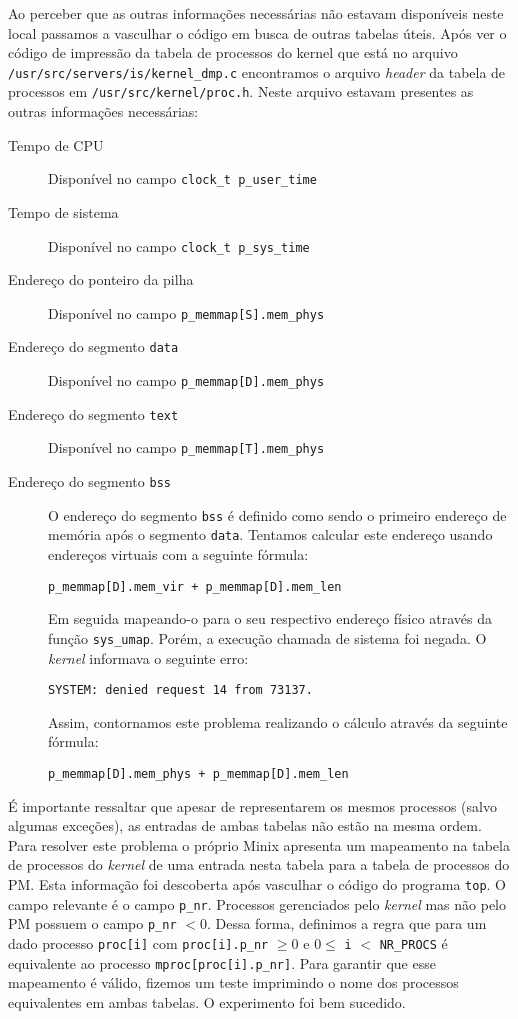 \documentclass[brazil, a4paper]{scrartcl}
\begin{document}
Ao perceber que as outras informações necessárias não estavam disponíveis neste
local passamos a vasculhar o código em busca de outras tabelas úteis. Após ver o
código de impressão da tabela de processos do kernel que está no arquivo
\texttt{/usr/src/servers/is/kernel\_dmp.c} encontramos o arquivo \emph{header}
da tabela de processos em \texttt{/usr/src/kernel/proc.h}. Neste arquivo estavam
presentes as outras informações necessárias:

\begin{description}
	\item[Tempo de CPU] Disponível no campo \texttt{clock\_t p\_user\_time}
	\item[Tempo de sistema] Disponível no campo \texttt{clock\_t p\_sys\_time}
	\item[Endereço do ponteiro da pilha] Disponível no campo \texttt{p\_memmap[S].mem\_phys}
	\item[Endereço do segmento \texttt{data}] Disponível no campo \texttt{p\_memmap[D].mem\_phys}
	\item[Endereço do segmento \texttt{text}] Disponível no campo \texttt{p\_memmap[T].mem\_phys}
	\item[Endereço do segmento \texttt{bss}] O endereço do segmento \texttt{bss} 
		é definido como sendo o primeiro endereço
		de memória após o segmento \texttt{data}. Tentamos calcular este endereço
		usando endereços virtuais com a seguinte fórmula:
		
		\texttt{p\_memmap[D].mem\_vir + p\_memmap[D].mem\_len}
		
		Em seguida mapeando-o para o seu
		respectivo endereço físico através da função \texttt{sys\_umap}.
		Porém, a execução chamada de sistema foi negada. O \emph{kernel}
		informava o seguinte erro: 
		
		\texttt{SYSTEM: denied request 14 from 73137.}
		
		Assim, contornamos este problema realizando o cálculo através da
		seguinte fórmula:
		
		\texttt{p\_memmap[D].mem\_phys + p\_memmap[D].mem\_len}
		
		
\end{description}

É importante ressaltar que apesar de representarem os mesmos processos
(salvo algumas exceções), as
entradas de ambas tabelas não estão na mesma ordem. Para resolver este problema
o próprio Minix apresenta um mapeamento na tabela de processos do \emph{kernel}
de uma entrada nesta tabela para a tabela de processos do PM. Esta informação 
foi descoberta após vasculhar o código do programa \texttt{top}. O campo
relevante é o campo \texttt{p\_nr}. Processos gerenciados pelo \emph{kernel}
mas não pelo PM possuem o campo \texttt{p\_nr} $< 0$. Dessa forma, definimos a 
regra que para um dado processo \texttt{proc[i]} com \texttt{proc[i].p\_nr} $\ge
0$ e $0 \le$ \texttt{i} $<$ \texttt{NR\_PROCS} é equivalente ao processo
\texttt{mproc[proc[i].p\_nr]}. Para garantir que esse mapeamento é
válido, fizemos um teste imprimindo o nome dos processos equivalentes em ambas
tabelas. O experimento foi bem sucedido.
\end{document}
